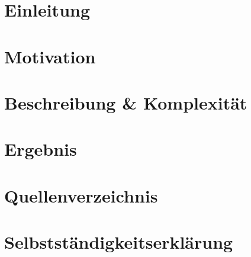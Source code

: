 \documentclass[a4paper, 10pt]{article}
\begin{document}

\newpage
{}
\tableofcontents
\clearpage 
{} 
\section{Einleitung}

\section{Motivation}

\section{Beschreibung \& Komplexität}

\section{Ergebnis}

\newpage
\section{Quellenverzeichnis}
\printbibliography
\newpage
\section{Selbstständigkeitserklärung}

\end{document}
